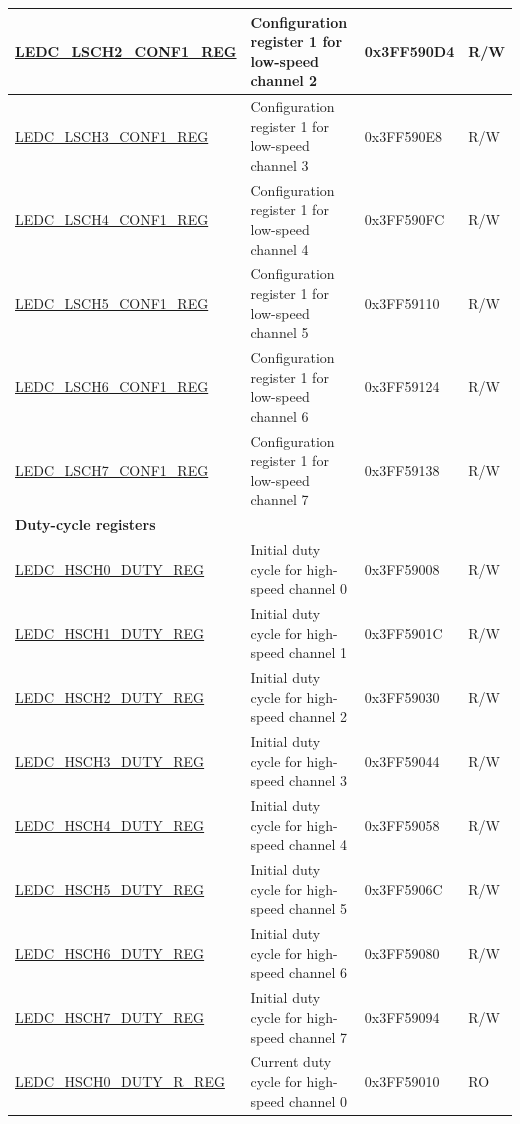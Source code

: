 \begin{longtable}{ | p{4.7cm} | p{7.3cm} | p{2cm} | p{1cm} | }
\hyperref[regdesc:LEDCLSCHnCONF1REG]{LEDC\_LSCH2\_CONF1\_REG} & Configuration register 1 for low-speed channel 2 & 0x3FF590D4 & R/W \\ \hline
\hyperref[regdesc:LEDCLSCHnCONF1REG]{LEDC\_LSCH3\_CONF1\_REG} & Configuration register 1 for low-speed channel 3 & 0x3FF590E8 & R/W \\ \hline
\hyperref[regdesc:LEDCLSCHnCONF1REG]{LEDC\_LSCH4\_CONF1\_REG} & Configuration register 1 for low-speed channel 4 & 0x3FF590FC & R/W \\ \hline
\hyperref[regdesc:LEDCLSCHnCONF1REG]{LEDC\_LSCH5\_CONF1\_REG} & Configuration register 1 for low-speed channel 5 & 0x3FF59110 & R/W \\ \hline
\hyperref[regdesc:LEDCLSCHnCONF1REG]{LEDC\_LSCH6\_CONF1\_REG} & Configuration register 1 for low-speed channel 6 & 0x3FF59124 & R/W \\ \hline
\hyperref[regdesc:LEDCLSCHnCONF1REG]{LEDC\_LSCH7\_CONF1\_REG} & Configuration register 1 for low-speed channel 7 & 0x3FF59138 & R/W \\ \hline
\multicolumn{4}{|l|}{\textbf{Duty-cycle registers}} \\ \hline
\hyperref[regdesc:LEDCHSCHnDUTYREG]{LEDC\_HSCH0\_DUTY\_REG} & Initial duty cycle for high-speed channel 0 & 0x3FF59008 & R/W \\ \hline
\hyperref[regdesc:LEDCHSCHnDUTYREG]{LEDC\_HSCH1\_DUTY\_REG} & Initial duty cycle for high-speed channel 1 & 0x3FF5901C & R/W \\ \hline
\hyperref[regdesc:LEDCHSCHnDUTYREG]{LEDC\_HSCH2\_DUTY\_REG} & Initial duty cycle for high-speed channel 2 & 0x3FF59030 & R/W \\ \hline
\hyperref[regdesc:LEDCHSCHnDUTYREG]{LEDC\_HSCH3\_DUTY\_REG} & Initial duty cycle for high-speed channel 3 & 0x3FF59044 & R/W \\ \hline
\hyperref[regdesc:LEDCHSCHnDUTYREG]{LEDC\_HSCH4\_DUTY\_REG} & Initial duty cycle for high-speed channel 4 & 0x3FF59058 & R/W \\ \hline
\hyperref[regdesc:LEDCHSCHnDUTYREG]{LEDC\_HSCH5\_DUTY\_REG} & Initial duty cycle for high-speed channel 5 & 0x3FF5906C & R/W \\ \hline
\hyperref[regdesc:LEDCHSCHnDUTYREG]{LEDC\_HSCH6\_DUTY\_REG} & Initial duty cycle for high-speed channel 6 & 0x3FF59080 & R/W \\ \hline
\hyperref[regdesc:LEDCHSCHnDUTYREG]{LEDC\_HSCH7\_DUTY\_REG} & Initial duty cycle for high-speed channel 7 & 0x3FF59094 & R/W \\ \hline
\hyperref[regdesc:LEDCHSCHnDUTYRREG]{LEDC\_HSCH0\_DUTY\_R\_REG} & Current duty cycle for high-speed channel 0 & 0x3FF59010 & RO \\ \hline

\end{longtable}
